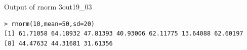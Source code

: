 \begin{Rscreen}{Output of rnorm 3}{out19_03}
	\begin{verbatim}
> rnorm(10,mean=50,sd=20)
[1] 61.71058 64.18932 47.81393 40.93006 62.11775 13.64088 62.60197
[8] 44.47632 44.31681 31.61356
\end{verbatim}
\end{Rscreen}
